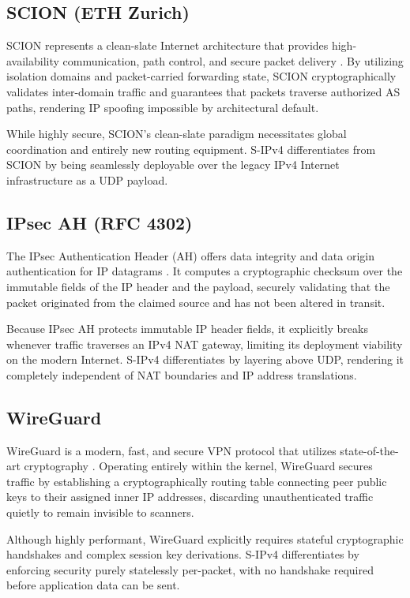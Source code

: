 \documentclass[journal]{IEEEtran}
\begin{document}
\subsection{SCION (ETH Zurich)}
SCION represents a clean-slate Internet architecture that provides high-availability communication, path control, and secure packet delivery \cite{perrig2017scion}. By utilizing isolation domains and packet-carried forwarding state, SCION cryptographically validates inter-domain traffic and guarantees that packets traverse authorized AS paths, rendering IP spoofing impossible by architectural default.

While highly secure, SCION's clean-slate paradigm necessitates global coordination and entirely new routing equipment. S-IPv4 differentiates from SCION by being seamlessly deployable over the legacy IPv4 Internet infrastructure as a UDP payload.

\subsection{IPsec AH (RFC 4302)}
The IPsec Authentication Header (AH) offers data integrity and data origin authentication for IP datagrams \cite{kent2005ipsec}. It computes a cryptographic checksum over the immutable fields of the IP header and the payload, securely validating that the packet originated from the claimed source and has not been altered in transit. 

Because IPsec AH protects immutable IP header fields, it explicitly breaks whenever traffic traverses an IPv4 NAT gateway, limiting its deployment viability on the modern Internet. S-IPv4 differentiates by layering above UDP, rendering it completely independent of NAT boundaries and IP address translations.

\subsection{WireGuard}
WireGuard is a modern, fast, and secure VPN protocol that utilizes state-of-the-art cryptography \cite{donenfeld2017wireguard}. Operating entirely within the kernel, WireGuard secures traffic by establishing a cryptographically routing table connecting peer public keys to their assigned inner IP addresses, discarding unauthenticated traffic quietly to remain invisible to scanners.

Although highly performant, WireGuard explicitly requires stateful cryptographic handshakes and complex session key derivations. S-IPv4 differentiates by enforcing security purely statelessly per-packet, with no handshake required before application data can be sent.
\end{document}
